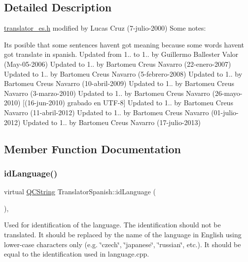 \subsection{Detailed Description}
\mbox{\hyperlink{translator__es_8h_source}{translator\+\_\+es.\+h}} modified by Lucas Cruz (7-\/julio-\/2000) Some notes\+:
\begin{DoxyItemize}
\item It\textquotesingle{}s posible that some sentences haven\textquotesingle{}t got meaning because some words haven\textquotesingle{}t got translate in spanish. Updated from 1.. to 1.. by Guillermo Ballester Valor (May-\/05-\/2006) Updated to 1.. by Bartomeu Creus Navarro (22-\/enero-\/2007) Updated to 1.. by Bartomeu Creus Navarro (5-\/febrero-\/2008) Updated to 1.. by Bartomeu Creus Navarro (10-\/abril-\/2009) Updated to 1.. by Bartomeu Creus Navarro (3-\/marzo-\/2010) Updated to 1.. by Bartomeu Creus Navarro (26-\/mayo-\/2010) \mbox{[}(16-\/jun-\/2010) grabado en U\+T\+F-\/8\mbox{]} Updated to 1.. by Bartomeu Creus Navarro (11-\/abril-\/2012) Updated to 1.. by Bartomeu Creus Navarro (01-\/julio-\/2012) Updated to 1.. by Bartomeu Creus Navarro (17-\/julio-\/2013) 
\end{DoxyItemize}

\subsection{Member Function Documentation}
\mbox{\label{class_translator_spanish_a54b0725f5a9de0d516dfa60bd86292d0}} 
\subsubsection{\texorpdfstring{idLanguage()}{idLanguage()}}
{\footnotesize\ttfamily virtual \mbox{\hyperlink{class_q_c_string}{Q\+C\+String}} Translator\+Spanish\+::id\+Language (\begin{DoxyParamCaption}{ }\end{DoxyParamCaption})\hspace{0.3cm}{\ttfamily [inline]}, {\ttfamily [virtual]}}

Used for identification of the language. The identification should not be translated. It should be replaced by the name of the language in English using lower-\/case characters only (e.\+g. \char`\"{}czech\char`\"{}, \char`\"{}japanese\char`\"{}, \char`\"{}russian\char`\"{}, etc.). It should be equal to the identification used in language.\+cpp. 

